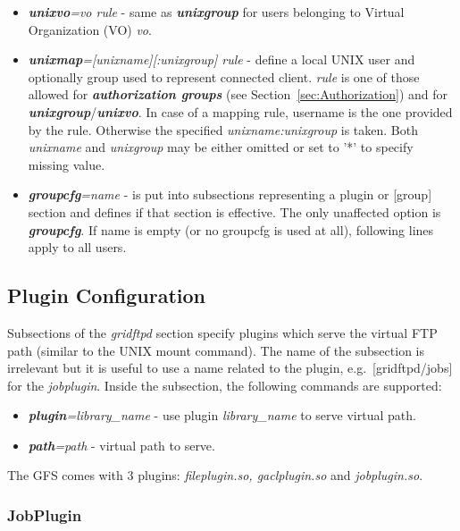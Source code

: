 \documentclass{article}
\begin{document}
\begin{itemize}
\item \textbf{\textit{unixvo}}\textit{=vo rule} - same as
  \textbf{\textit{unixgroup}} for users belonging to Virtual
  Organization (VO) \textit{vo}.
\item \textbf{\textit{unixmap}}\textit{={[}unixname]{[}:unixgroup]
  rule} - define a local UNIX user and optionally group used to
  represent connected client. \textit{rule} is one of those allowed
  for \textbf{\textit{authorization groups}} (see
  Section~\ref{sec:Authorization}) and for
  \textbf{\textit{unixgroup}}/\textbf{\textit{unixvo}}.  In case of a
  mapping rule, username is the one provided by the rule. Otherwise
  the specified \textit{unixname:unixgroup} is taken. Both
  \textit{unixname} and \textit{unixgroup} may be either omitted or
  set to '{*}' to specify missing value.
\item \textbf{\textit{groupcfg}}\textit{=name} - is put into
  subsections representing a plugin or {[}group] section and defines
  if that section is effective. The only unaffected option is
  \textbf{\textit{groupcfg}}.  If name is empty (or no groupcfg is
  used at all), following lines apply to all users.
\end{itemize}

\subsection{Plugin Configuration}

Subsections of the \emph{gridftpd} section specify plugins which serve
the virtual FTP path (similar to the UNIX mount command). The name of
the subsection is irrelevant but it is useful to use a name related to
the plugin, e.g.\ {[}gridftpd/jobs] for the \emph{jobplugin}. Inside
the subsection, the following commands are supported:

\begin{itemize}
\item \textbf{\textit{plugin}}\textit{=library\_name} - use plugin
  \textit{library\_name} to serve virtual path.
\item \textbf{\textit{path}}\textit{=path} - virtual path to serve.
\end{itemize}

The GFS comes with 3 plugins: \textit{fileplugin.so, gaclplugin.so} and
\textit{jobplugin.so}.

\subsubsection{JobPlugin}
\end{document}
